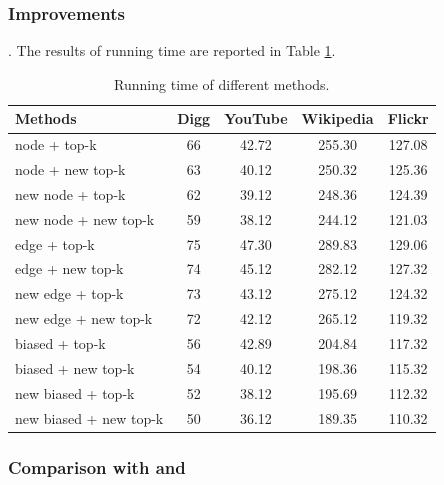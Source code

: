 {\subsubsection{Improvements}
. The results of running time are reported in Table \ref{tab_improvements}. \\
\begin{table}
\caption{Running time of different methods.}
\label{tab_improvements}
\vspace{-2ex}
\centering
\newcommand{\tabincell}[2]{\begin{tabular}{@{}#1@{}}#2\end{tabular}}
\begin{tabular}{l|c|c|c|c}
\hline \hline Methods & Digg & YouTube & Wikipedia & Flickr \\
\hline \hline
node + top-k            & 66    & 42.72 & 255.30 & 127.08 \\
node + new top-k        & 63    & 40.12 & 250.32 & 125.36 \\
new node + top-k        & 62    & 39.12 & 248.36 & 124.39 \\
new node + new top-k    & 59    & 38.12 & 244.12 & 121.03 \\
\hline
edge + top-k            & 75    & 47.30 & 289.83 & 129.06 \\
edge + new top-k        & 74    & 45.12 & 282.12 & 127.32 \\
new edge + top-k        & 73    & 43.12 & 275.12 & 124.32 \\
new edge + new top-k    & 72    & 42.12 & 265.12 & 119.32 \\
\hline
biased + top-k          & 56    & 42.89 & 204.84 & 117.32 \\
biased + new top-k      & 54    & 40.12 & 198.36 & 115.32 \\
new biased + top-k      & 52    & 38.12 & 195.69 & 112.32 \\
new biased + new top-k  & 50    & 36.12 & 189.35 & 110.32 \\
\hline \hline
\end{tabular}
\end{table} }


\subsubsection{Comparison with \Aa and \BIGCLAM }



